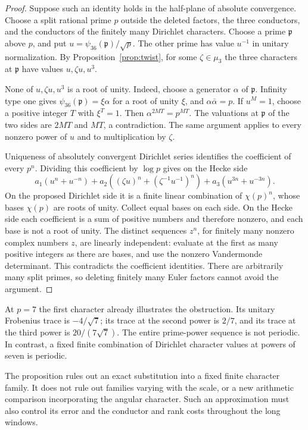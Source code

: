 \documentclass[11pt]{article}
\theoremstyle{definition}
\theoremstyle{remark}
\begin{document}
\begin{proof}
Suppose such an identity holds in the half-plane of absolute
convergence.  Choose a split rational prime $p$ outside the deleted
factors, the three conductors, and the conductors of the finitely many
Dirichlet characters.  Choose a prime $\mathfrak p$ above $p$, and put
$u=\psi_{36}(\mathfrak p)/\sqrt p$.  The other prime has value $u^{-1}$
in unitary normalization.  By Proposition~\ref{prop:twist}, for some
$\zeta\in\mu_3$ the three characters at $\mathfrak p$ have values
$u,\zeta u,u^3$.

None of $u,\zeta u,u^3$ is a root of unity.  Indeed, choose a generator $\alpha$ of $\mathfrak p$.  Infinity type one gives $\psi_{36}(\mathfrak p)=\xi\alpha$ for a root of unity $\xi$, and $\alpha\bar\alpha=p$.  If $u^M=1$, choose a positive integer $T$ with $\xi^T=1$.  Then $\alpha^{2MT}=p^{MT}$.  The valuations at $\mathfrak p$ of the two sides are $2MT$ and $MT$, a contradiction.  The same argument applies to
every nonzero power of $u$ and to multiplication by $\zeta$.

Uniqueness of absolutely convergent Dirichlet series identifies the
coefficient of every $p^n$.  Dividing this coefficient by $\log p$ gives
on the Hecke side
\[
 a_1(u^n+u^{-n})+
 a_2((\zeta u)^n+(\zeta^{-1}u^{-1})^n)+
 a_3(u^{3n}+u^{-3n}).
\]
On the proposed Dirichlet side it is a finite linear combination of
$\chi(p)^n$, whose bases $\chi(p)$ are roots of unity.  Collect equal
bases on each side.  On the Hecke side each coefficient is a sum of
positive numbers and therefore nonzero, and each base is not a root
of unity.  The distinct sequences $z^n$, for finitely many nonzero
complex numbers $z$, are linearly independent: evaluate at the first
as many positive integers as there are bases, and use the nonzero
Vandermonde determinant.  This contradicts the coefficient identities.
There are arbitrarily many split primes, so deleting finitely many
Euler factors cannot avoid the argument.
\end{proof}

At $p=7$ the first character already illustrates the obstruction.
Its unitary Frobenius trace is $-4/\sqrt7$; its trace at the second
power is $2/7$, and its trace at the third power is $20/(7\sqrt7)$.
The entire prime-power sequence is not periodic.  In contrast, a
fixed finite combination of Dirichlet character values at powers of
seven is periodic.

The proposition rules out an exact substitution into a fixed finite
character family.  It does not rule out families varying with the
scale, or a new arithmetic comparison incorporating the angular
character.  Such an approximation must also control its error and the
conductor and rank costs throughout the long windows.
\end{document}
